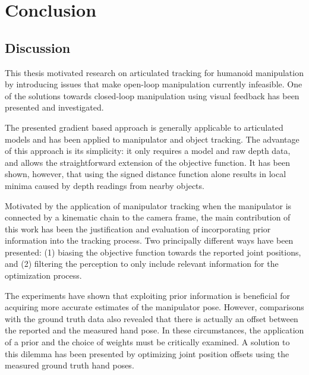 \chapter{Conclusion}
\label{sec:conclusion}

\section{Discussion}

This thesis motivated research on articulated tracking for humanoid manipulation by introducing issues that make open-loop manipulation currently infeasible. One of the solutions towards closed-loop manipulation using visual feedback has been presented and investigated.

The presented gradient based approach is generally applicable to articulated models and has been applied to manipulator and object tracking. The advantage of this approach is its simplicity: it only requires a model and raw depth data, and allows the straightforward extension of the objective function.
It has been shown, however, that using the signed distance function alone results in local minima caused by depth readings from nearby objects.

Motivated by the application of manipulator tracking when the manipulator is connected by a kinematic chain to the camera frame, the main contribution of this work has been the justification and evaluation of incorporating prior information into the tracking process. Two principally different ways have been presented: (1) biasing the objective function towards the reported joint positions, and (2) filtering the perception to only include relevant information for the optimization process.

The experiments have shown that exploiting prior information is beneficial for acquiring more accurate estimates of the manipulator pose.
However, comparisons with the ground truth data also revealed that there is actually an offset between the reported and the measured hand pose. In these circumstances, the application of a prior and the choice of weights must be critically examined. A solution to this dilemma has been presented by optimizing joint position offsets using the measured ground truth hand poses.



